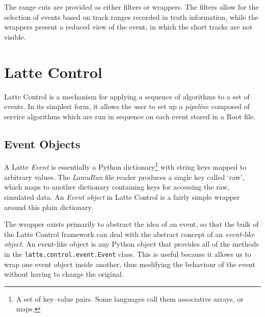 The range cuts are provided as either filters or wrappers. The filters allow for the selection of events based on track ranges recorded in truth information, while the wrappers present a reduced view of the event, in which the short tracks are not visible.

\section{Latte Control}\label{sec:LatteControl}
Latte Control is a mechanism for applying a sequence of algorithms to a set of events. In its simplest form, it allows the user to set up a \emph{pipeline} composed of service algorithms which are run in sequence on each event stored in a {\sc Root}\citep{Root} file.

\subsection{Event Objects}
A Latte \emph{Event} is essentially a Python dictionary\footnote{A set of key--value pairs. Some languages call them associative arrays, or maps.} with string keys mapped to arbitrary values. The \emph{LamuRun} file reader produces a single key called `raw', which maps to another dictionary containing keys for accessing the raw, simulated data. An \emph{Event object} in Latte Control is a fairly simple wrapper around this plain dictionary.

The wrapper exists primarily to abstract the idea of an event, so that the bulk of the Latte Control framework can deal with the abstract concept of an \emph{event-like object}. An event-like object is any Python object that provides all of the methods in the \texttt{latte.control.event.Event} class. This is useful because it allows us to wrap one event object inside another, thus modifying the behaviour of the event without having to change the original.

